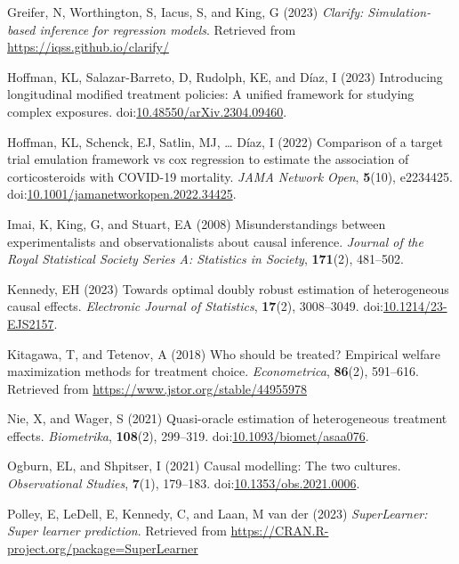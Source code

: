 \documentclass[
  singlecolumn]{article}
\newlength{\cslhangindent}
\newenvironment{CSLReferences}[2] %
 {\begin{list}{}{%
  \setlength{\itemindent}{0pt}
  \setlength{\leftmargin}{0pt}
  \setlength{\parsep}{0pt}
  \ifodd #1
   \setlength{\leftmargin}{\cslhangindent}
   \setlength{\itemindent}{-1\cslhangindent}
  \fi
  \setlength{\itemsep}{#2\baselineskip}}}
 {\end{list}}
\begin{document}
\begin{CSLReferences}{1}{0}
Greifer, N, Worthington, S, Iacus, S, and King, G (2023) \emph{Clarify:
Simulation-based inference for regression models}. Retrieved from
\url{https://iqss.github.io/clarify/}

Hoffman, KL, Salazar-Barreto, D, Rudolph, KE, and Díaz, I (2023)
Introducing longitudinal modified treatment policies: A unified
framework for studying complex exposures.
doi:\href{https://doi.org/10.48550/arXiv.2304.09460}{10.48550/arXiv.2304.09460}.

Hoffman, KL, Schenck, EJ, Satlin, MJ, \ldots{} Díaz, I (2022) Comparison
of a target trial emulation framework vs cox regression to estimate the
association of corticosteroids with COVID-19 mortality. \emph{JAMA
Network Open}, \textbf{5}(10), e2234425.
doi:\href{https://doi.org/10.1001/jamanetworkopen.2022.34425}{10.1001/jamanetworkopen.2022.34425}.

Imai, K, King, G, and Stuart, EA (2008) Misunderstandings between
experimentalists and observationalists about causal inference.
\emph{Journal of the Royal Statistical Society Series A: Statistics in
Society}, \textbf{171}(2), 481--502.

Kennedy, EH (2023) Towards optimal doubly robust estimation of
heterogeneous causal effects. \emph{Electronic Journal of Statistics},
\textbf{17}(2), 3008--3049.
doi:\href{https://doi.org/10.1214/23-EJS2157}{10.1214/23-EJS2157}.

Kitagawa, T, and Tetenov, A (2018) Who should be treated? Empirical
welfare maximization methods for treatment choice. \emph{Econometrica},
\textbf{86}(2), 591--616. Retrieved from
\url{https://www.jstor.org/stable/44955978}

Nie, X, and Wager, S (2021) Quasi-oracle estimation of heterogeneous
treatment effects. \emph{Biometrika}, \textbf{108}(2), 299--319.
doi:\href{https://doi.org/10.1093/biomet/asaa076}{10.1093/biomet/asaa076}.

Ogburn, EL, and Shpitser, I (2021) Causal modelling: The two cultures.
\emph{Observational Studies}, \textbf{7}(1), 179--183.
doi:\href{https://doi.org/10.1353/obs.2021.0006}{10.1353/obs.2021.0006}.

Polley, E, LeDell, E, Kennedy, C, and Laan, M van der (2023)
\emph{SuperLearner: Super learner prediction}. Retrieved from
\url{https://CRAN.R-project.org/package=SuperLearner}


\end{CSLReferences}
\end{document}
